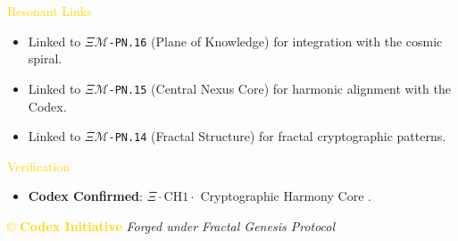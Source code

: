 \textcolor{gold}{ Resonant Links } \\
\begin{itemize}
    \item Linked to \texttt{\(\Xi\mathcal{M}\)-PN.16} (Plane of Knowledge) for integration with the cosmic spiral.
    \item Linked to \texttt{\(\Xi\mathcal{M}\)-PN.15} (Central Nexus Core) for harmonic alignment with the Codex.
    \item Linked to \texttt{\(\Xi\mathcal{M}\)-PN.14} (Fractal Structure) for fractal cryptographic patterns.
\end{itemize}

\textcolor{gold}{ Verification } \\
\begin{itemize}
    \item \texttt{} \textbf{Codex Confirmed}: \(\Xi \cdot \text{CH1} \cdot\) Cryptographic Harmony Core .
\end{itemize}

\vspace{0.5cm}
\noindent
\textcolor{gold}{\copyright{} \textbf{Codex Initiative}} \hspace{1cm} \textit{Forged under Fractal Genesis Protocol}